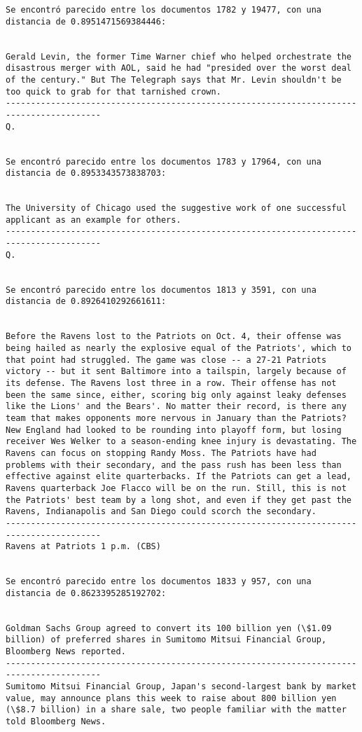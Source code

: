 \documentclass[11pt]{article}
\begin{document}
\begin{Verbatim}[commandchars=\\\{\}]
Se encontró parecido entre los documentos 1782 y 19477, con una distancia de 0.8951471569384446:


Gerald Levin, the former Time Warner chief who helped orchestrate the disastrous merger with AOL, said he had "presided over the worst deal of the century." But The Telegraph says that Mr. Levin shouldn't be too quick to grab for that tarnished crown.
-----------------------------------------------------------------------------------------
Q.


Se encontró parecido entre los documentos 1783 y 17964, con una distancia de 0.8953343573838703:


The University of Chicago used the suggestive work of one successful applicant as an example for others.
-----------------------------------------------------------------------------------------
Q.


Se encontró parecido entre los documentos 1813 y 3591, con una distancia de 0.8926410292661611:


Before the Ravens lost to the Patriots on Oct. 4, their offense was being hailed as nearly the explosive equal of the Patriots', which to that point had struggled. The game was close -- a 27-21 Patriots victory -- but it sent Baltimore into a tailspin, largely because of its defense. The Ravens lost three in a row. Their offense has not been the same since, either, scoring big only against leaky defenses like the Lions' and the Bears'. No matter their record, is there any team that makes opponents more nervous in January than the Patriots? New England had looked to be rounding into playoff form, but losing receiver Wes Welker to a season-ending knee injury is devastating. The Ravens can focus on stopping Randy Moss. The Patriots have had problems with their secondary, and the pass rush has been less than effective against elite quarterbacks. If the Patriots can get a lead, Ravens quarterback Joe Flacco will be on the run. Still, this is not the Patriots' best team by a long shot, and even if they get past the Ravens, Indianapolis and San Diego could scorch the secondary.
-----------------------------------------------------------------------------------------
Ravens at Patriots 1 p.m. (CBS)


Se encontró parecido entre los documentos 1833 y 957, con una distancia de 0.8623395285192702:


Goldman Sachs Group agreed to convert its 100 billion yen (\$1.09 billion) of preferred shares in Sumitomo Mitsui Financial Group, Bloomberg News reported.
-----------------------------------------------------------------------------------------
Sumitomo Mitsui Financial Group, Japan's second-largest bank by market value, may announce plans this week to raise about 800 billion yen (\$8.7 billion) in a share sale, two people familiar with the matter told Bloomberg News.



\end{Verbatim}
\end{document}
